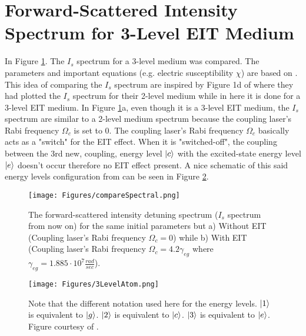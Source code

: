 \section{Forward-Scattered Intensity Spectrum for 3-Level EIT Medium}
In Figure \ref{fig: comparing Is spectrum}. The $I_{s}$ spectrum for a 3-level medium was compared. The parameters and important equations (e.g. electric susceptibility $\chi$) are based on . This idea of comparing the $I_{s}$ spectrum are inspired by Figure 1d of  where they had plotted the $I_{s}$ spectrum for their 2-level medium while in here it is done for a 3-level EIT medium. In Figure \ref{fig: comparing Is spectrum}a, even though it is a 3-level EIT medium, the $I_{s}$ spectrum are similar to a 2-level medium spectrum \cite{Kwong2014} because the coupling laser's Rabi frequency $\Omega_{c}$ is set to $0$. The coupling laser's Rabi frequency $\Omega_{c}$ basically acts as a "switch" for the EIT effect. When it is "switched-off", the coupling between the 3rd new, coupling, energy level $\ket{c}$ with the excited-state energy level $\ket{e}$ doesn't occur therefore no EIT effect present. A nice schematic of this said energy levels configuration from  can be seen in Figure \ref{fig: 3LevelAtom}.

\begin{figure}
    \centering
    \texttt{[image: Figures/compareSpectral.png]}
    \caption[Plot of $I_{s}$ Spectrum For 3-Level EIT-Disabled and EIT-Enabled Medium]{The forward-scattered intensity detuning spectrum ($I_{s}$ spectrum from now on) for the same initial parameters but a) Without EIT (Coupling laser's Rabi frequency $\Omega_{c} = 0$) while b) With EIT (Coupling laser's Rabi frequency $\Omega_{c} = 4.2\gamma_{eg}$ where $\gamma_{eg} = 1.885 \cdot 10^{7} \frac{rad}{sec}$).}
    \label{fig: comparing Is spectrum}
\end{figure}

\begin{figure}
    \centering
    \texttt{[image: Figures/3LevelAtom.png]}
    \caption[Schematic of The Energy Levels Involved in A 3-Level EIT Medium]{Note that the different notation used here for the energy levels. $\ket{1}$ is equivalent to $\ket{g}$. $\ket{2}$ is equivalent to $\ket{c}$. $\ket{3}$ is equivalent to $\ket{e}$. Figure courtesy of \protect\cite{Jeong2009}.}
    \label{fig: 3LevelAtom}
\end{figure}

